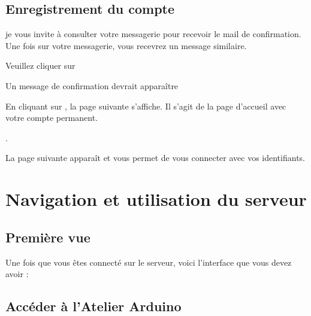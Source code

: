 \subsection{Enregistrement du compte}

je vous invite à consulter votre messagerie pour recevoir le mail de confirmation. \\


Une fois sur votre messagerie, vous recevrez un message similaire.

Veuillez cliquer sur 


Un message de confirmation devrait apparaître 


En cliquant sur , la page suivante s'affiche. Il s'agit de la page d'accueil avec votre compte permanent.\\



. \\



La page suivante apparaît et vous permet de vous connecter avec vos identifiants.



\newpage


\section{Navigation et utilisation du serveur}

\subsection{Première vue}

Une fois que vous êtes connecté sur le serveur, voici l'interface que vous devez avoir : 



\subsection{Accéder à l'Atelier Arduino}

